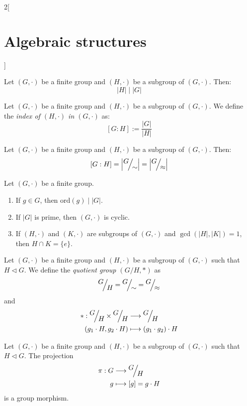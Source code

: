 \documentclass[../../../main.tex]{subfiles}
\begin{document}
\begin{multicols}{2}[\section{Algebraic structures}]
\begin{prop}
    \end{prop}
    \begin{theorem}
        Let $(G,\cdot)$ be a finite group and $(H,\cdot)$ be a subgroup of $(G,\cdot)$. Then: $$|H|\mid|G|$$
    \end{theorem}
    \begin{definition}
        Let $(G,\cdot)$ be a finite group and $(H,\cdot)$ be a subgroup of $(G,\cdot)$. We define the \textit{index of $(H,\cdot)$ in $(G,\cdot)$} as: $$[G:H]:=\frac{|G|}{|H|}$$
    \end{definition}
    \begin{corollary}
        Let $(G,\cdot)$ be a finite group and $(H,\cdot)$ be a subgroup of $(G,\cdot)$. Then: $$[G:H]=\left|\quot{G}{\sim}\right|=\left|\quot{G}{\approx}\right|$$
    \end{corollary}
    \begin{corollary}
        Let $(G,\cdot)$ be a finite group.
        \begin{enumerate}
            \item If $g\in G$, then $\text{ord}(g)\mid |G|$.
            \item If $|G|$ is prime, then $(G,\cdot)$ is cyclic.
            \item If $(H,\cdot)$ and $(K,\cdot)$ are subgroups of $(G,\cdot)$ and $\gcd(|H|,|K|)=1$, then $H\cap K=\{e\}$.
        \end{enumerate}
    \end{corollary}
    \begin{definition}
        Let $(G,\cdot)$ be a finite group and $(H,\cdot)$ be a subgroup of $(G,\cdot)$ such that $H\lhd G$. We define the \textit{quotient group $\left(G/H,*\right)$} as $$\quot{G}{H}=\quot{G}{\sim}=\quot{G}{\approx}$$ and
        \begin{align*}
            *:\quot{G}{H}\times\quot{G}{H} & \longrightarrow\quot{G}{H}        \\
            (g_1\cdot H,g_2\cdot H)        & \longmapsto (g_1\cdot g_2)\cdot H
        \end{align*}
    \end{definition}
    \begin{lemma}
        Let $(G,\cdot)$ be a finite group and $(H,\cdot)$ be a subgroup of $(G,\cdot)$ such that $H\lhd G$. The projection
        \begin{align*}
            \pi:G & \longrightarrow\quot{G}{H} \\
            g     & \longmapsto[g]=g\cdot H
        \end{align*}
        is a group morphism.
    \end{lemma}

\end{multicols}
\end{document}
